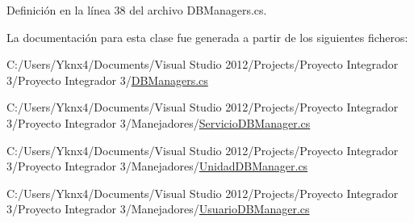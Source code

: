 Definición en la línea 38 del archivo D\-B\-Managers.\-cs.



La documentación para esta clase fue generada a partir de los siguientes ficheros\-:\begin{DoxyCompactItemize}
\item 
C\-:/\-Users/\-Yknx4/\-Documents/\-Visual Studio 2012/\-Projects/\-Proyecto Integrador 3/\-Proyecto Integrador 3/\hyperlink{_d_b_managers_8cs}{D\-B\-Managers.\-cs}\item 
C\-:/\-Users/\-Yknx4/\-Documents/\-Visual Studio 2012/\-Projects/\-Proyecto Integrador 3/\-Proyecto Integrador 3/\-Manejadores/\hyperlink{_servicio_d_b_manager_8cs}{Servicio\-D\-B\-Manager.\-cs}\item 
C\-:/\-Users/\-Yknx4/\-Documents/\-Visual Studio 2012/\-Projects/\-Proyecto Integrador 3/\-Proyecto Integrador 3/\-Manejadores/\hyperlink{_unidad_d_b_manager_8cs}{Unidad\-D\-B\-Manager.\-cs}\item 
C\-:/\-Users/\-Yknx4/\-Documents/\-Visual Studio 2012/\-Projects/\-Proyecto Integrador 3/\-Proyecto Integrador 3/\-Manejadores/\hyperlink{_usuario_d_b_manager_8cs}{Usuario\-D\-B\-Manager.\-cs}\end{DoxyCompactItemize}
